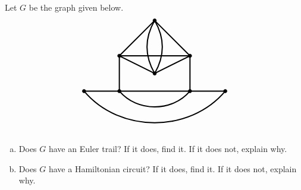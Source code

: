 \documentclass[11pt,letterpaper]{article}
\begin{document}
 Let $G$ be the graph given below.
	\[
	\begin{tikzpicture}[scale=1.5]
	\draw[line width=0.05cm] (-2,0) to (2,0);
	\draw[line width=0.05cm] (-1,0) to (-1,1);
	\draw[line width=0.05cm] (1,0) to (1,1);
	\draw[line width=0.05cm] (-1,1) to (1,1);
	\draw[line width=0.05cm] (-1,1) to (0,2);
	\draw[line width=0.05cm] (1,1) to (0,2);
	\draw[line width=0.05cm] (-1,1) to (0,0.5);
	\draw[line width=0.05cm] (1,1) to (0,0.5);
	\draw[line width=0.05cm, bend right=50] (-1,0) to (1,0);
	\draw[line width=0.05cm, bend right=50] (-2,0) to (2,0);
	\draw[line width=0.05cm, bend right= 30] (0,2) to (0,0.5);
	\draw[line width=0.05cm, bend left= 30] (0,2) to (0,0.5);
	
	\draw[fill= black] (0,2) circle (0.05);
	\draw[fill= black] (-1,1) circle (0.05);
	\draw[fill= black] (1,1) circle (0.05);
	\draw[fill= black] (0,0.5) circle (0.05);
	\draw[fill= black] (-2,0) circle (0.05);
	\draw[fill= black] (-1,0) circle (0.05);
	\draw[fill= black] (1,0) circle (0.05);
	\draw[fill= black] (2,0) circle (0.05);
	\end{tikzpicture}
	\]
\begin{enumerate}[(a)]
\item Does $G$ have an Euler trail? If it does, find it. If it does not, explain why. 
\item Does $G$ have a Hamiltonian circuit? If it does, find it. If it does not, explain why. 
\end{enumerate}





\newpage
\end{document}
